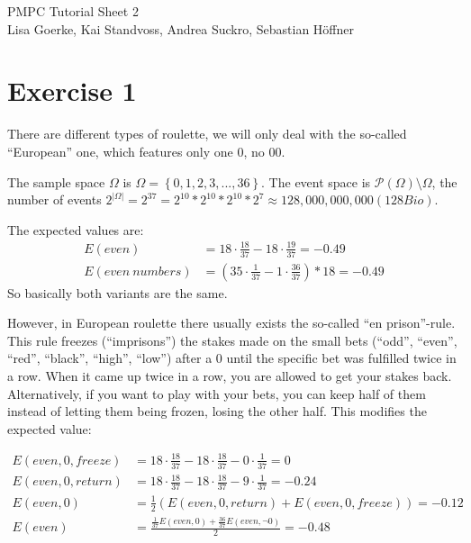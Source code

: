 \documentclass{article}
\begin{document}
\begin{center}
\LARGE PMPC Tutorial Sheet 2\\
\small Lisa Goerke, Kai Standvoss, Andrea Suckro, Sebastian H\"offner
\end{center}
\vspace{0.5cm}
\normalsize

\section*{Exercise 1}
There are different types of roulette, we will only deal with the so-called 
``European'' one, which features only one $0$, no $00$.

The sample space $\Omega$ is $\Omega=\left\{0, 1, 2, 3, ..., 36\right\}$. The event space is $\mathcal{P} \left( \Omega \right) \setminus \Omega$, the number of events $2^{|\Omega|} = 2^37 = 2^10 * 2^10 * 2^10 * 2^7 \approx 128,000,000,000 (128 Bio)$.

The expected values are:
\begin{align*}
E(even) &= 18 \cdot \frac{18}{37} - 18 \cdot \frac{19}{37} = -0.49\\
E(even\ numbers) &= \left(35 \cdot \frac{1}{37} - 1 \cdot \frac{36}{37} \right) * 18 = -0.49
\end{align*}
So basically both variants are the same. 

However, in European roulette there usually exists the so-called ``en prison''-rule. This rule freezes (``imprisons'') the stakes made on the small bets (``odd'', ``even'', ``red'', ``black'', ``high'', ``low'') after a $0$ until the specific bet was fulfilled twice in a row. When it came up twice in a row, you are allowed to get your stakes back. Alternatively, if you want to play with your bets, you can keep half of them instead of letting them being frozen, losing the other half. This modifies the expected value:

\begin{align*}
E(even, 0, freeze) &= 18 \cdot \frac{18}{37} - 18 \cdot \frac{18}{37} - 0 \cdot \frac{1}{37} = 0  \\
E(even, 0, return) &= 18 \cdot \frac{18}{37} - 18 \cdot \frac{18}{37} - 9 \cdot \frac{1}{37} = -0.24  \\
E(even, 0) &= \frac{1}{2} \left( E(even, 0, return) + E(even, 0, freeze) \right) = -0.12 \\
E(even) &= \frac{\frac{1}{37} E(even, 0) + \frac{36}{37} E(even, \neg 0)}{2} = -0.48
\end{align*}
\end{document}
